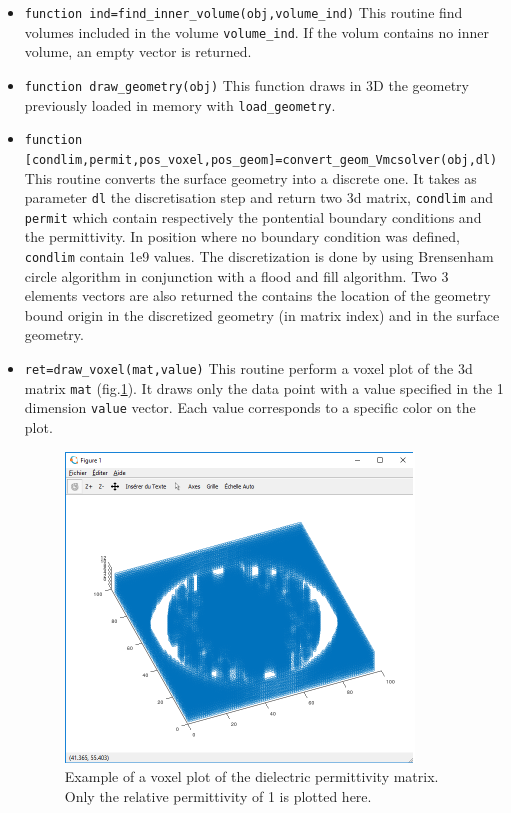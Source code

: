 \documentclass[10pt]{article}
\begin{document}
\begin{itemize}
		\item \lstinline{function ind=find_inner_volume(obj,volume_ind)} This routine find volumes included in the volume \lstinline{volume_ind}. If the volum contains no inner volume, an empty vector is returned.
		\item \lstinline{function draw_geometry(obj)} This function draws in 3D the geometry previously loaded in memory with \lstinline {load_geometry}.  
		\item \lstinline{function [condlim,permit,pos_voxel,pos_geom]=convert_geom_Vmcsolver(obj,dl)} This routine converts the surface geometry into a discrete one. It takes as parameter \lstinline{dl} the discretisation step and return two 3d matrix, \lstinline{condlim} and \lstinline{permit} which contain respectively the pontential boundary conditions and the permittivity. In position where no boundary condition was defined,  \lstinline{condlim} contain 1e9 values. The discretization is done by using Brensenham circle algorithm in conjunction with a flood and fill algorithm. Two 3 elements vectors are also returned the contains the location of the geometry bound origin in the discretized geometry (in matrix index) and in the surface geometry. 
		\item \lstinline{ret=draw_voxel(mat,value)} This routine perform a voxel plot of the 3d matrix \lstinline{mat} (fig.\ref{fig:voxel}). It draws only the data point with a value specified in the 1 dimension \lstinline{value} vector. Each value corresponds to a specific color on the plot. 
		
			\begin{figure}[!htb]
			\centering
			\includegraphics[scale=1.4]{voxel.pdf}
			\caption{Example of a voxel plot of the dielectric permittivity matrix. Only the relative permittivity of 1 is plotted here.}   
			\label{fig:voxel}
		\end{figure}
		
		\end{itemize}
\end{document}

